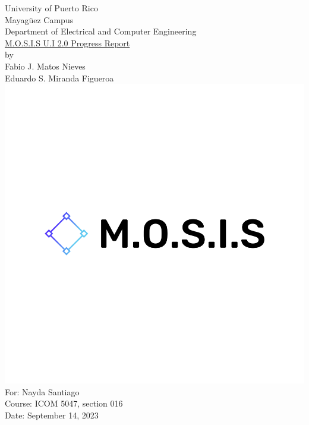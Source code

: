 \linespread{1.0}
\begin{titlepage}
	\begin{center}
		\large{University of Puerto Rico\\
			Mayagüez Campus\\
			\vspace{\baselineskip}
			Department of Electrical and Computer Engineering}\\
		\vspace{5\baselineskip}
		\Huge{\underline{M.O.S.I.S U.I 2.0 Progress Report}\\}
		\vspace{\baselineskip}
		\large by\\
		Fabio J. Matos Nieves\\
		Eduardo S. Miranda Figueroa\\
		\normalsize
		\includegraphics[scale=0.15]{../../M.O.S.I.S Logo/default.png}\\
		\vspace{4\baselineskip}
		\large
		For: Nayda Santiago\\
		Course: ICOM 5047, section 016\\
		Date: September 14, 2023\\
		\normalsize

	\end{center}
\end{titlepage}